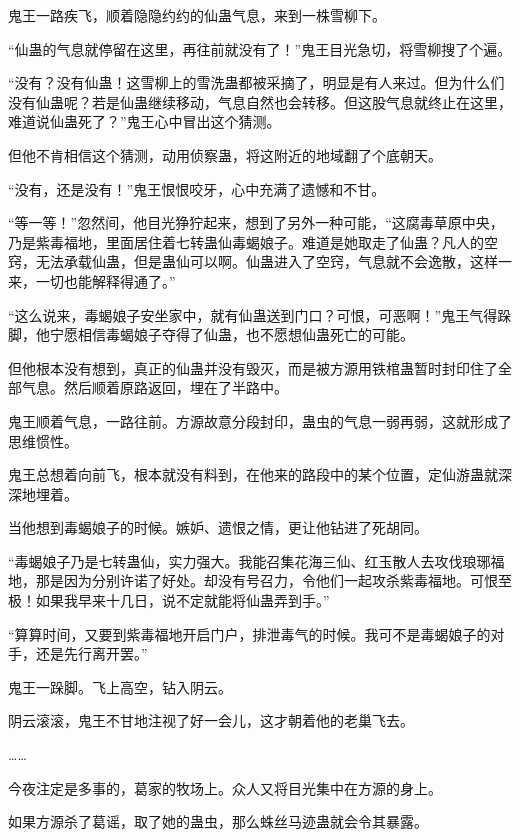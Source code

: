 
\begin{this_body}



鬼王一路疾飞，顺着隐隐约约的仙蛊气息，来到一株雪柳下。

“仙蛊的气息就停留在这里，再往前就没有了！”鬼王目光急切，将雪柳搜了个遍。

“没有？没有仙蛊！这雪柳上的雪洗蛊都被采摘了，明显是有人来过。但为什么们没有仙蛊呢？若是仙蛊继续移动，气息自然也会转移。但这股气息就终止在这里，难道说仙蛊死了？”鬼王心中冒出这个猜测。

但他不肯相信这个猜测，动用侦察蛊，将这附近的地域翻了个底朝天。

“没有，还是没有！”鬼王恨恨咬牙，心中充满了遗憾和不甘。

“等一等！”忽然间，他目光狰狞起来，想到了另外一种可能，“这腐毒草原中央，乃是紫毒福地，里面居住着七转蛊仙毒蝎娘子。难道是她取走了仙蛊？凡人的空窍，无法承载仙蛊，但是蛊仙可以啊。仙蛊进入了空窍，气息就不会逸散，这样一来，一切也能解释得通了。”

“这么说来，毒蝎娘子安坐家中，就有仙蛊送到门口？可恨，可恶啊！”鬼王气得跺脚，他宁愿相信毒蝎娘子夺得了仙蛊，也不愿想仙蛊死亡的可能。

但他根本没有想到，真正的仙蛊并没有毁灭，而是被方源用铁棺蛊暂时封印住了全部气息。然后顺着原路返回，埋在了半路中。

鬼王顺着气息，一路往前。方源故意分段封印，蛊虫的气息一弱再弱，这就形成了思维惯性。

鬼王总想着向前飞，根本就没有料到，在他来的路段中的某个位置，定仙游蛊就深深地埋着。

当他想到毒蝎娘子的时候。嫉妒、遗恨之情，更让他钻进了死胡同。

“毒蝎娘子乃是七转蛊仙，实力强大。我能召集花海三仙、红玉散人去攻伐琅琊福地，那是因为分别许诺了好处。却没有号召力，令他们一起攻杀紫毒福地。可恨至极！如果我早来十几日，说不定就能将仙蛊弄到手。”

“算算时间，又要到紫毒福地开启门户，排泄毒气的时候。我可不是毒蝎娘子的对手，还是先行离开罢。”

鬼王一跺脚。飞上高空，钻入阴云。

阴云滚滚，鬼王不甘地注视了好一会儿，这才朝着他的老巢飞去。

……

今夜注定是多事的，葛家的牧场上。众人又将目光集中在方源的身上。

如果方源杀了葛谣，取了她的蛊虫，那么蛛丝马迹蛊就会令其暴露。


\end{this_body}
